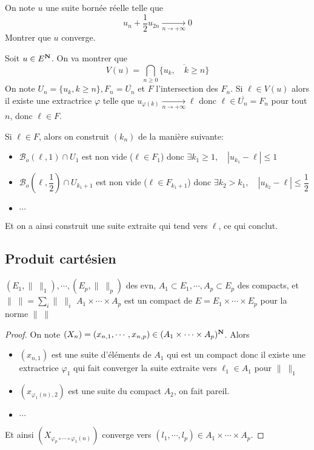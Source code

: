 \begin{exo}
On note $u$ une suite bornée réelle telle que  \[
    u_n+\frac{1}{2}u_{2n} \xrightarrow[n\to+\infty]{}0
\] 
Montrer que $u$ converge.
\end{exo}

 \begin{rem}
 Soit $u \in  E^{\mathbf N}$. On va montrer que \[
     V(u)=\bigcap_{n\geq 0} \overline{\{ u_k,\quad k\geq n\}}
 \]
 On note $U_n=\{u_k, k\geq n\}, F_n=\overline{U_n}$ et $ F$ l'intersection des  $F_n$. Si  $ \ell  \in V(u)$ alors il existe une extractrice $\varphi$ telle que  $u_{\varphi (k)} \xrightarrow[n\to+\infty]{}\ell $ donc $\ell  \in  \overline{ U_n }=F_n$ pour tout $n$, donc  $\ell  \in  F$.

 Si $\ell  \in  F$, alors on construit $(k_n)$ de la manière suivante:  \begin{itemize}
     \item $\mathcal  B_o(\ell ,1)\cap U_1$ est non vide ($ \ell  \in  F_1$) donc $ \exists  k_1\geq 1,\quad |u_{k_1}-\ell |\leq 1$
     \item $\mathcal  B_o(\ell ,\dfrac{1}{2}) \cap U_{k_1+1}$ est non vide ($\ell  \in  F_{k_1+1}$) donc $ \exists  k_2>k_1,\quad |u_{k_2}-\ell |\leq \dfrac{1}{2}$
     \item $\cdots $
 \end{itemize}
 Et on a ainsi construit une suite extraite qui tend vers $\ell $, ce qui conclut.
 \end{rem}

 \subsection{Produit cartésien}

 \begin{prop}
     \Hyp $(E_1, \|\;\|_1),\cdots ,(E_p,\|\;\|_p)$ des evn, $A_1\subset E_1, \cdots , A_p\subset E_p$ des compacts, et $\|\;\|=\sum_i \| \;\|_i$ 
     \Conc $A_1\times \cdots  \times A_p$ est un compact de $E=E_1\times \cdots \times E_p$ pour la norme $\|\;\|$
 \end{prop}

 \begin{proof}
     On note $(X_n)=(x_{n,1},\cdots ,x_{n,p})\in (A_1\times \cdots \times A_p)^{\mathbf N}$. Alors \begin{itemize}
         \item $(x_{n,1})$ est une suite d'éléments de $A_1$ qui est un compact donc il existe une extractrice  $\varphi_1$ qui fait converger la suite extraite vers $\ell_{1} \in  A_1$ pour $\|\;\|_1$
         \item  $(x_{\varphi_1(n),2})$ est une suite du compact $A_2$, on fait pareil. 
         \item $\cdots $
     \end{itemize}
     Et ainsi $(X_{\varphi_p\circ \cdots \circ \varphi_1(n)})$ converge vers $(l_1,\cdots ,l_p)\in  A_1\times \cdots \times A_p$.
 \end{proof}

